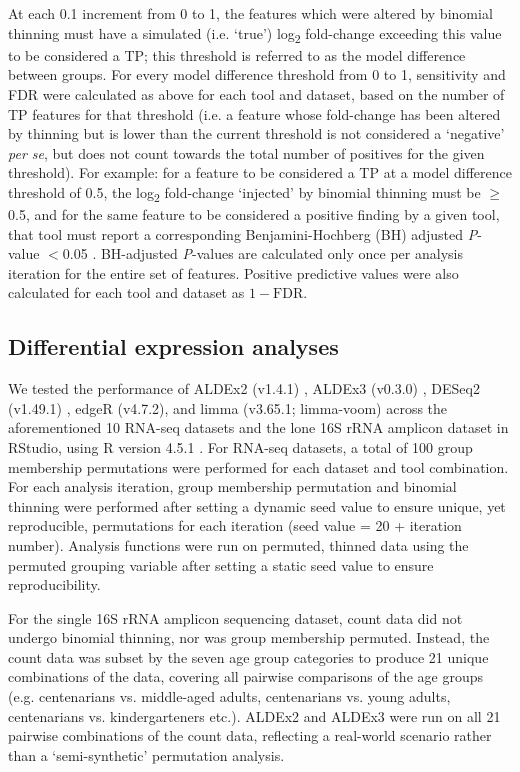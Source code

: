 \documentclass[10pt,letterpaper]{article}
\begin{document}
At each 0.1 increment from 0 to 1, the features which were altered by binomial thinning must have a simulated (i.e. `true') log\textsubscript{2} fold-change exceeding this value to be considered a TP; this threshold is referred to as the model difference between groups. For every model difference threshold from 0 to 1, sensitivity and FDR were calculated as above for each tool and dataset, based on the number of TP features for that threshold (i.e. a feature whose fold-change has been altered by thinning but is lower than the current threshold is not considered a `negative' \textit{per se}, but does not count towards the total number of positives for the given threshold). For example: for a feature to be considered a TP at a model difference threshold of 0.5, the log\textsubscript{2} fold-change `injected' by binomial thinning must be $\geq$0.5, and for the same feature to be considered a positive finding by a given tool, that tool must report a corresponding Benjamini-Hochberg (BH) adjusted \textit{P}-value $<$0.05 \cite{benjamini:1995}. BH-adjusted \textit{P}-values are calculated only once per analysis iteration for the entire set of features. Positive predictive values were also calculated for each tool and dataset as $1 - \mathrm{FDR}$.

\subsection*{Differential expression analyses}
We tested the performance of ALDEx2 (v1.4.1) \cite{fernandes:2014}, ALDEx3 (v0.3.0) \cite{konnaris_uncertainty_2025}, DESeq2 (v1.49.1) \cite{love_moderated_2014}, edgeR (v4.7.2), and limma (v3.65.1; limma-voom) \cite{ritchie_limma_2015} across the aforementioned 10 RNA-seq datasets and the lone 16S rRNA amplicon dataset in RStudio, using R version 4.5.1 \cite{r_core_2025}. For RNA-seq datasets, a total of 100 group membership permutations were performed for each dataset and tool combination. For each analysis iteration, group membership permutation and binomial thinning were performed after setting a dynamic seed value to ensure unique, yet reproducible, permutations for each iteration (seed value = 20 + iteration number). Analysis functions were run on permuted, thinned data using the permuted grouping variable after setting a static seed value to ensure reproducibility. 

For the single 16S rRNA amplicon sequencing dataset, count data did not undergo binomial thinning, nor was group membership permuted. Instead, the count data was subset by the seven age group categories to produce 21 unique combinations of the data, covering all pairwise comparisons of the age groups (e.g. centenarians vs. middle-aged adults, centenarians vs. young adults, centenarians vs. kindergarteners etc.). ALDEx2 and ALDEx3 were run on all 21 pairwise combinations of the count data, reflecting a real-world scenario rather than a `semi-synthetic' permutation analysis.
\end{document}
